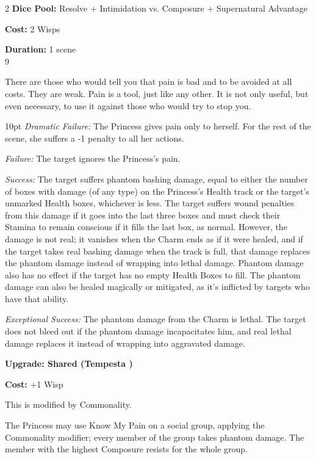 \begin{multicols}{2}
\noindent \textbf{Dice Pool:} Resolve + Intimidation vs. Composure + Supernatural Advantage

\noindent \textbf{Cost:} 2 Wisps

\noindent \textbf{Duration:} 1 scene\\ 9

\noindent There are those who would tell you that pain is bad and to be avoided at all costs. They are weak. Pain is a tool, just like any other. It is not only useful, but even necessary, to use it against those who would try to stop you.

\begin{myindentpar}{10pt}    \emph{Dramatic Failure:} The Princess gives pain only to herself. For the rest of the scene, she suffers a -1 penalty to all her actions.

    \emph{Failure:} The target ignores the Princess's pain.

    \emph{Success:} The target suffers phantom bashing damage, equal to either the number of boxes with damage (of any type) on the Princess's Health track or the target's unmarked Health boxes, whichever is less. The target suffers wound penalties from this damage if it goes into the last three boxes and must check their Stamina to remain conscious if it fills the last box, as normal. However, the damage is not real; it vanishes when the Charm ends as if it were healed, and if the target takes real bashing damage when the track is full, that damage replaces the phantom damage instead of wrapping into lethal damage. Phantom damage also has no effect if the target has no empty Health Boxes to fill. The phantom damage can also be healed magically or mitigated, as it's inflicted by targets who have that ability.

    \emph{Exceptional Success:} The phantom damage from the Charm is lethal. The target does not bleed out if the phantom damage incapacitates him, and real lethal damage replaces it instead of wrapping into aggravated damage. 

\textbf{Upgrade: Shared (Tempesta \textbullet\textbullet\textbullet)}

\noindent \textbf{Cost:} +1 Wisp

\noindent This is modified by Commonality. 

The Princess may use Know My Pain on a social group, applying the Commonality modifier; every member of the group takes phantom damage. The member with the highest Composure resists for the whole group.


\end{myindentpar}
\end{multicols}
